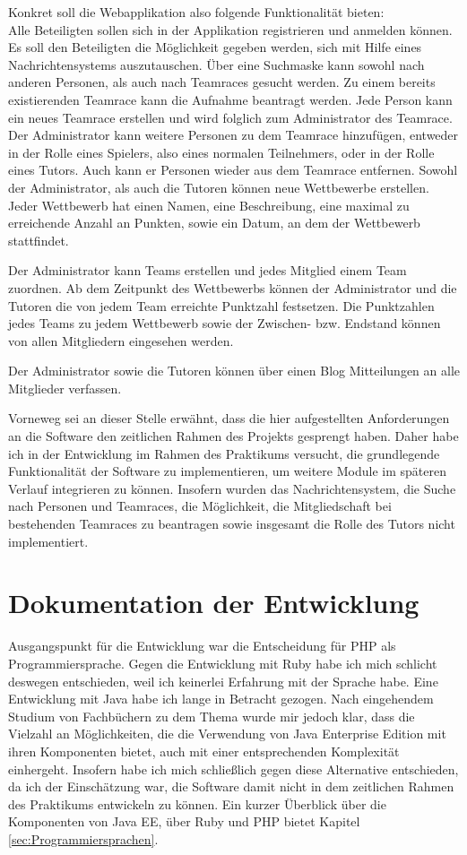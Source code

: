 \documentclass[12pt]{report}
\begin{document}
Konkret soll die Webapplikation also folgende Funktionalität bieten:\\
Alle Beteiligten sollen sich in der Applikation registrieren und anmelden können. Es soll den Beteiligten die Möglichkeit gegeben werden, sich mit Hilfe eines Nachrichtensystems auszutauschen. Über eine Suchmaske kann sowohl nach anderen Personen, als auch nach Teamraces gesucht werden. Zu einem bereits existierenden Teamrace kann die Aufnahme beantragt werden. Jede Person kann ein neues Teamrace erstellen und wird folglich zum Administrator des Teamrace. Der Administrator kann weitere Personen zu dem Teamrace hinzufügen, entweder in der Rolle eines Spielers, also eines normalen Teilnehmers, oder in der Rolle eines Tutors. Auch kann er Personen wieder aus dem Teamrace entfernen. Sowohl der Administrator, als auch die Tutoren können neue Wettbewerbe erstellen. Jeder Wettbewerb hat einen Namen, eine Beschreibung, eine maximal zu erreichende Anzahl an Punkten, sowie ein Datum, an dem der Wettbewerb stattfindet. 

Der Administrator kann Teams erstellen und jedes Mitglied einem Team zuordnen. Ab dem Zeitpunkt des Wettbewerbs können der Administrator und die Tutoren die von jedem Team erreichte Punktzahl festsetzen. Die Punktzahlen jedes Teams zu jedem Wettbewerb sowie der Zwischen- bzw. Endstand können von allen Mitgliedern eingesehen werden.

Der Administrator sowie die Tutoren können über einen Blog Mitteilungen an alle Mitglieder verfassen.

Vorneweg sei an dieser Stelle erwähnt, dass die hier aufgestellten Anforderungen an die Software den zeitlichen Rahmen des Projekts gesprengt haben. Daher habe ich in der Entwicklung im Rahmen des Praktikums versucht, die grundlegende Funktionalität der Software zu implementieren, um weitere Module im späteren Verlauf integrieren zu können. Insofern wurden das Nachrichtensystem, die Suche nach Personen und Teamraces, die Möglichkeit, die Mitgliedschaft bei bestehenden Teamraces zu beantragen sowie insgesamt die Rolle des Tutors nicht implementiert.

\chapter{Dokumentation der Entwicklung}

Ausgangspunkt für die Entwicklung war die Entscheidung für PHP als Programmiersprache. Gegen die Entwicklung mit Ruby habe ich mich schlicht deswegen entschieden, weil ich keinerlei Erfahrung mit der Sprache habe. Eine Entwicklung mit Java habe ich lange in Betracht gezogen. Nach eingehendem Studium von Fachbüchern zu dem Thema wurde mir jedoch klar, dass die Vielzahl an Möglichkeiten, die die Verwendung von Java Enterprise Edition mit ihren Komponenten bietet, auch mit einer entsprechenden Komplexität einhergeht. Insofern habe ich mich schließlich gegen diese Alternative entschieden, da ich der Einschätzung war, die Software damit nicht in dem zeitlichen Rahmen des Praktikums entwickeln zu können. Ein kurzer Überblick über die Komponenten von Java EE, über Ruby und PHP bietet Kapitel \ref{sec:Programmiersprachen}.
\end{document}
